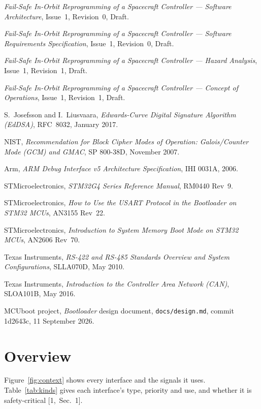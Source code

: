 \documentclass[11pt,a4paper]{article}
\begin{document}
\noindent [2] \emph{Fail-Safe In-Orbit Reprogramming of a Spacecraft
Controller --- Software Architecture}, Issue~1, Revision~0, Draft.

\noindent [3] \emph{Fail-Safe In-Orbit Reprogramming of a Spacecraft
Controller --- Software Requirements Specification}, Issue~1, Revision~0,
Draft.

\noindent [4] \emph{Fail-Safe In-Orbit Reprogramming of a Spacecraft
Controller --- Hazard Analysis}, Issue~1, Revision~1, Draft.

\noindent [5] \emph{Fail-Safe In-Orbit Reprogramming of a Spacecraft
Controller --- Concept of Operations}, Issue~1, Revision~1, Draft.

\noindent [6] S.~Josefsson and I.~Liusvaara, \emph{Edwards-Curve Digital
Signature Algorithm (EdDSA)}, RFC~8032, January 2017.

\noindent [7] NIST, \emph{Recommendation for Block Cipher Modes of Operation:
Galois/Counter Mode (GCM) and GMAC}, SP 800-38D, November 2007.

\noindent [8] Arm, \emph{ARM Debug Interface v5 Architecture Specification},
IHI 0031A, 2006.

\noindent [9] STMicroelectronics, \emph{STM32G4 Series Reference Manual},
RM0440 Rev~9.

\noindent [10] STMicroelectronics, \emph{How to Use the USART Protocol in the
Bootloader on STM32 MCUs}, AN3155 Rev~22.

\noindent [11] STMicroelectronics, \emph{Introduction to System Memory Boot
Mode on STM32 MCUs}, AN2606 Rev~70.

\noindent [12] Texas Instruments, \emph{RS-422 and RS-485 Standards Overview
and System Configurations}, SLLA070D, May 2010.

\noindent [13] Texas Instruments, \emph{Introduction to the Controller Area
Network (CAN)}, SLOA101B, May 2016.

\noindent [14] MCUboot project, \emph{Bootloader} design document,
\texttt{docs/design.md}, commit 1d2643c, 11 September 2026.

\section{Overview}
Figure~\ref{fig:context} shows every interface and the signals it uses.
Table~\ref{tab:kinds} gives each interface's type, priority and use, and
whether it is safety-critical [1,~Sec.~1].
\end{document}
